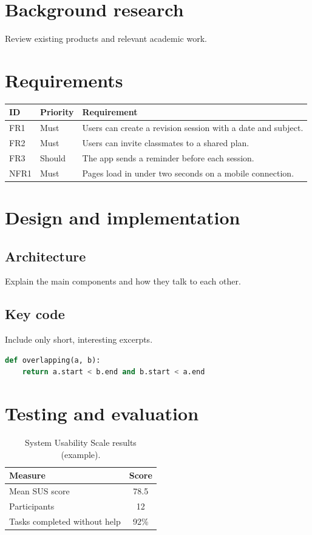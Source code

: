\documentclass[12pt,a4paper]{report}
\begin{document}
\chapter{Background research}
Review existing products and relevant academic work.

\chapter{Requirements}
\begin{tabularx}{\linewidth}{@{}llX@{}}
\toprule
ID & Priority & Requirement \\
\midrule
FR1 & Must & Users can create a revision session with a date and subject. \\
FR2 & Must & Users can invite classmates to a shared plan. \\
FR3 & Should & The app sends a reminder before each session. \\
NFR1 & Must & Pages load in under two seconds on a mobile connection. \\
\bottomrule
\end{tabularx}

\chapter{Design and implementation}
\section{Architecture}
Explain the main components and how they talk to each other.
\section{Key code}
Include only short, interesting excerpts.
\begin{lstlisting}[language=Python]
def overlapping(a, b):
    return a.start < b.end and b.start < a.end
\end{lstlisting}

\chapter{Testing and evaluation}
\begin{table}[ht]
\centering
\caption{System Usability Scale results (example).}
\begin{tabular}{lc}
\toprule
Measure & Score \\
\midrule
Mean SUS score & 78.5 \\
Participants & 12 \\
Tasks completed without help & 92\% \\
\bottomrule
\end{tabular}
\end{table}
\end{document}
